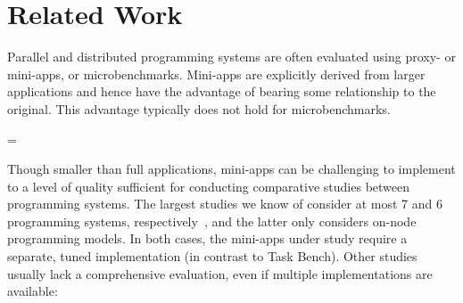 \section{Related Work}
\label{sec:related-work}

{}

Parallel and distributed programming systems are often
evaluated using proxy- or mini-apps, or
microbenchmarks. Mini-apps are explicitly derived from larger
applications and hence have the advantage of bearing some
relationship to the original. This advantage typically does not hold
for microbenchmarks.

\brokenpenalty=\oldbrokenpenalty



Though smaller than full applications, mini-apps can be challenging to
implement to a level of quality sufficient for conducting comparative
studies between programming systems. The largest studies
we know of consider at most 7 and 6 programming systems,
respectively~\cite{LULESH13, Deakin19}, and the latter only considers
on-node programming models. In both cases, the mini-apps under study
require a separate, tuned implementation (in contrast to Task
Bench). Other studies usually lack a comprehensive evaluation, even if
multiple implementations are available:

